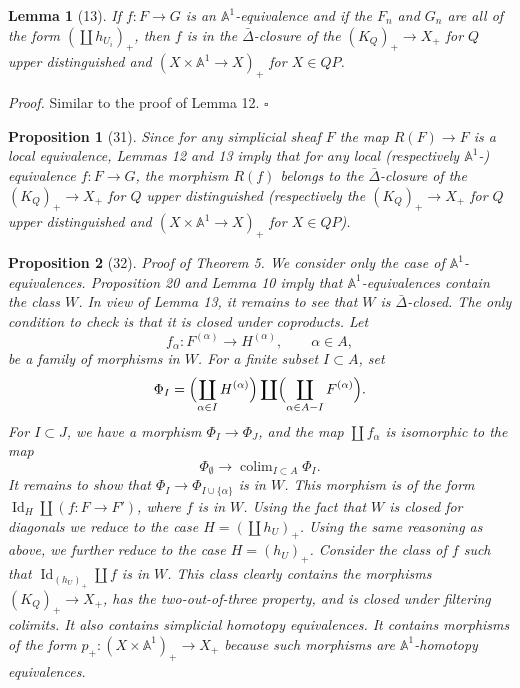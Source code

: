 \documentclass[11pt]{article}
\newcommand{\Aone}{\mathbb A^1}
\theoremstyle{deligne}
\newtheorem*{proposition*}{Proposition}
\newtheorem*{lemma*}{Lemma}
\newenvironment{proofdel}{\noindent\textit{Proof.}}{\hfill$\square$}
\newcommand{\colim}{\operatorname{colim}}
\newcommand{\Id}{\operatorname{Id}}
\begin{document}
\begin{lemma*}[13]
If \(f:F\to G\) is an \(\Aone\)-equivalence and if the \(F_n\) and \(G_n\) are all of the form \((\coprod h_{U_i})_+\), then \(f\) is in the \(\bar\Delta\)-closure of the \((K_Q)_+\to X_+\) for \(Q\) upper distinguished and \((X\times\Aone\to X)_+\) for \(X\in QP\).
\end{lemma*}

\begin{proofdel}
Similar to the proof of Lemma 12.
\end{proofdel}

\begin{proposition*}[31]
Since for any simplicial sheaf \(F\) the map \(R(F)\to F\) is a local equivalence, Lemmas 12 and 13 imply that for any local (respectively \(\Aone\)-) equivalence \(f:F\to G\), the morphism \(R(f)\) belongs to the \(\bar\Delta\)-closure of the \((K_Q)_+\to X_+\) for \(Q\) upper distinguished (respectively the \((K_Q)_+\to X_+\) for \(Q\) upper distinguished and \((X\times\Aone\to X)_+\) for \(X\in QP\)).
\end{proposition*}

\begin{proposition*}[32]
Proof of Theorem 5. We consider only the case of \(\Aone\)-equivalences. Proposition 20 and Lemma 10 imply that \(\Aone\)-equivalences contain the class \(W\). In view of Lemma 13, it remains to see that \(W\) is \(\bar\Delta\)-closed. The only condition to check is that it is closed under coproducts. Let
\[
f_\alpha:F^{(\alpha)}\longrightarrow H^{(\alpha)},\qquad \alpha\in A,
\]
be a family of morphisms in \(W\). For a finite subset \(I\subset A\), set
\[
\Phi_I=\Bigl(\coprod_{\alpha\in I} H^{(\alpha)}\Bigr)\coprod\Bigl(\coprod_{\alpha\in A-I}F^{(\alpha)}\Bigr).
\]
For \(I\subset J\), we have a morphism \(\Phi_I\to\Phi_J\), and the map \(\coprod f_\alpha\) is isomorphic to the map
\[
\Phi_\emptyset\longrightarrow \colim_{I\subset A}\Phi_I.
\]
It remains to show that \(\Phi_I\to \Phi_{I\cup\{\alpha\}}\) is in \(W\). This morphism is of the form \(\Id_H\coprod(f:F\to F')\), where \(f\) is in \(W\). Using the fact that \(W\) is closed for diagonals we reduce to the case \(H=(\coprod h_U)_+\). Using the same reasoning as above, we further reduce to the case \(H=(h_U)_+\). Consider the class of \(f\) such that \(\Id_{(h_U)_+}\coprod f\) is in \(W\). This class clearly contains the morphisms \((K_Q)_+\to X_+\), has the two-out-of-three property, and is closed under filtering colimits. It also contains simplicial homotopy equivalences. It contains morphisms of the form \(p_+:(X\times\Aone)_+\to X_+\) because such morphisms are \(\Aone\)-homotopy equivalences.
\end{proposition*}
\end{document}

